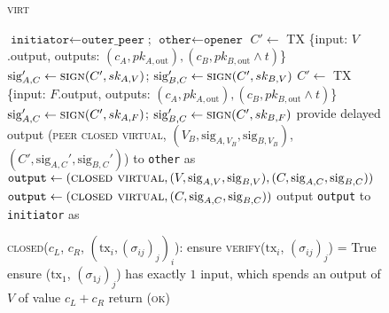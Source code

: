 \begin{figure}[H]
\begin{processbox}{\textsc{virt}}
\begin{algorithmic}[1]
            \State $\texttt{initiator} \gets \texttt{outer\_peer}$;
            $\texttt{other} \gets \texttt{opener}$
          \EndIf
              \State {}
              \State $C' \gets$ TX \{input: $V$.output, outputs: $(c_A, pk_{A,
              \mathrm{out}}), (c_B, pk_{B, \mathrm{out}} \wedge t)$\}
              \State $\mathrm{sig}_{A, C}' \gets \textsc{sign}(C', sk_{A, V})$;
              $\mathrm{sig}_{B, C}' \gets \textsc{sign}(C', sk_{B, V})$
            \Else \: 
              \State $C' \gets$ TX \{input: $F$.output, outputs: $(c_A, pk_{A,
              \mathrm{out}}), (c_B, pk_{B, \mathrm{out}} \wedge t)$\}
              \State $\mathrm{sig}_{A, C}' \gets \textsc{sign}(C', sk_{A, F})$;
              $\mathrm{sig}_{B, C}' \gets \textsc{sign}(C', sk_{B, F})$
            \EndIf
            \State provide delayed output (\textsc{peer closed virtual}, $(V_B,
            \mathrm{sig}_{A, V_B}, \mathrm{sig}_{B, V_B})$, $(C',
            \mathrm{sig}_{A, C}', \mathrm{sig}_{B, C}')$) to \texttt{other} as
            \bob
          \EndIf
            \State $\mathtt{output} \gets (\textsc{closed virtual}, (V,
            \mathrm{sig}_{A, V}, \mathrm{sig}_{B, V}), (C, \mathrm{sig}_{A, C},
            \mathrm{sig}_{B, C}))$
          \Else
            \State $\mathtt{output} \gets (\textsc{closed virtual}, (C,
            \mathrm{sig}_{A, C}, \mathrm{sig}_{B, C}))$
          \EndIf
          \State output \texttt{output} to \texttt{initiator} as \alice
        \EndIf
        \Statex

        \State \textsc{closed}($c_L$, $c_R$, $(\mathrm{tx}_i,
        (\sigma_{ij})_j)_i$):
        \Indent
            \State ensure \textsc{verify}($\mathrm{tx}_i$, $(\sigma_{ij})_j$) =
            True
          \EndFor
          \State ensure ($\mathrm{tx}_1$, $(\sigma_{1j})_j$) has exactly $1$
          input, which spends an output of $V$ of value $c_L + c_R$
          \State return (\textsc{ok})
        \EndIndent
    \end{algorithmic}
  \end{processbox}
  \caption{}
  \label{code:virtual-layer}
\end{figure}

